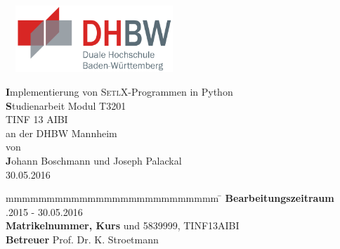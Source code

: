 
\begin{titlepage}
	\enlargethispage{20mm}
	\begin{center}
		\includegraphics[width=0.5\textwidth, height=2.5cm]{images/dhbw.png}
		
		\vspace*{12mm}	{\LARGE\textbf Implementierung von \textsc{SetlX}-Programmen in Python }\\
		\vspace*{12mm}	{\large\textbf Studienarbeit Modul T3201}\\
		\vspace*{12mm}	TINF 13 AIBI \\
    \vspace*{3mm}		an der DHBW Mannheim \\
		\vspace*{12mm}	von \\
		\vspace*{3mm}		{\large\textbf Johann Boschmann und Joseph Palackal}\\
		\vspace*{12mm}	30.05.2016\\
	\end{center}
	\vfill
	\begin{spacing}{1.2}
	\begin{tabbing}
		mmmmmmmmmmmmmmmmmmmmmmmmmm             \= \kill
		\textbf{Bearbeitungszeitraum}          .2015 - 30.05.2016\\
		\textbf{Matrikelnummer, Kurs}           und 5839999, TINF13AIBI\\
		\textbf{Betreuer}                      \>  Prof. Dr. K. Stroetmann\\
	\end{tabbing}
	\end{spacing}
\end{titlepage}
